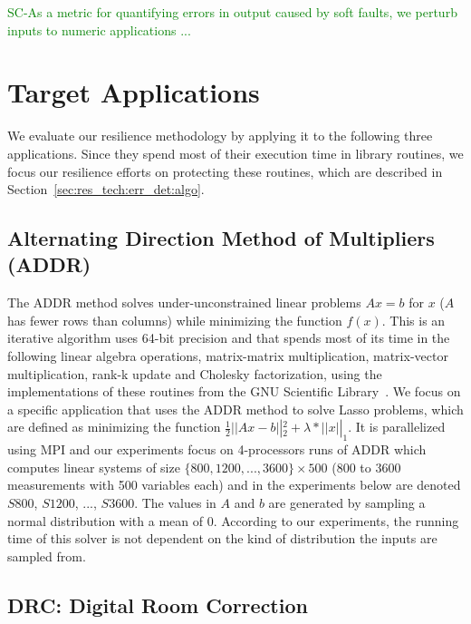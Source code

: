 \documentclass{sig-alternate}
\newcommand{\sui}[1]{%
  \textcolor{green}{SC-#1}
}
\newcommand{\greg}[1]{%
  \textcolor{blue}{GB: #1}
}
\begin{document}
{\sui{As a metric for quantifying errors in output caused by soft faults, we perturb inputs to numeric applications ...}

\section{Target Applications}
\label{sec:apps}

We evaluate our resilience methodology by applying it to the following three applications.
Since they spend most of their execution time in library routines, we focus our resilience efforts on protecting these routines, which are described in Section~\ref{sec:res_tech:err_det:algo}.


\subsection{Alternating Direction Method of Multipliers (ADDR)}
\label{sec:apps:lasso}
The ADDR method solves under-unconstrained linear problems $Ax=b$ for $x$ ($A$ has fewer rows than columns) while minimizing the function $f(x)$.
This is an iterative algorithm uses 64-bit precision and that spends most of its time in the following linear algebra operations, matrix-matrix multiplication, matrix-vector multiplication, rank-k update and Cholesky factorization, using the implementations of these routines from the GNU Scientific Library~\cite{gsl:2011}.
We focus on a specific application that uses the ADDR method to solve Lasso problems, which are defined as minimizing the function $\frac{1}{2} \left|| Ax - b \right||_2^2 + \lambda*\left|| x \right||_1$.
It is parallelized using MPI and our experiments focus on 4-processors runs of ADDR which computes linear systems of size $\{800, 1200, ..., 3600\} \times 500$ (800 to 3600 measurements with 500 variables each) and in the experiments below are denoted $S800$, $S1200$, ..., $S3600$.
The values in $A$ and $b$ are generated by sampling a normal distribution with a mean of 0.
According to our experiments, the running time of this solver is not dependent on the kind of distribution the inputs are sampled from.

\subsection{DRC: Digital Room Correction}
\label{sec:apps:drc}

}
\end{document}
